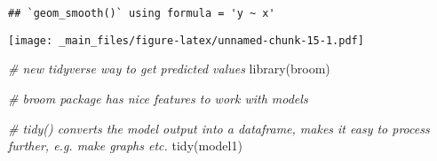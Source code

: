 \documentclass[
]{book}
\newenvironment{Shaded}{\begin{snugshade}}{\end{snugshade}}
\newcommand{\AttributeTok}[1]{\textcolor[rgb]{0.77,0.63,0.00}{#1}}
\newcommand{\CommentTok}[1]{\textcolor[rgb]{0.56,0.35,0.01}{\textit{#1}}}
\newcommand{\FunctionTok}[1]{\textcolor[rgb]{0.00,0.00,0.00}{#1}}
\newcommand{\NormalTok}[1]{#1}
\newcommand{\OtherTok}[1]{\textcolor[rgb]{0.56,0.35,0.01}{#1}}
\newcommand{\SpecialCharTok}[1]{\textcolor[rgb]{0.00,0.00,0.00}{#1}}
\newcommand{\StringTok}[1]{\textcolor[rgb]{0.31,0.60,0.02}{#1}}
\begin{document}
\begin{Shaded}
\end{Shaded}

\begin{verbatim}
## `geom_smooth()` using formula = 'y ~ x'
\end{verbatim}

\texttt{[image: \_main\_files/figure-latex/unnamed-chunk-15-1.pdf]}

\begin{Shaded}
\begin{Highlighting}[]
\CommentTok{\# new tidyverse way to get predicted values}
\FunctionTok{library}\NormalTok{(broom)}

\CommentTok{\# broom package has nice features to work with models}

\CommentTok{\# tidy() converts the model output into a dataframe, makes it easy to process further, e.g. make graphs etc.}
\FunctionTok{tidy}\NormalTok{(model1)}
\end{Highlighting}
\end{Shaded}
\end{document}

